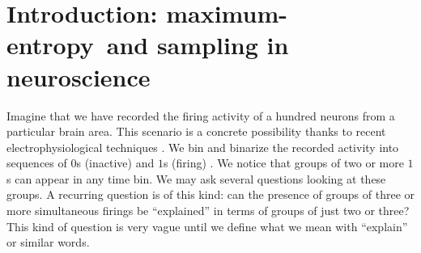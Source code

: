 \documentclass{article}
\title{\pdftitle}
\author{
  P.G.L. Porta Mana\\\texttt{piero.mana@ntnu.org}
  \And
  V. Rostami\\\texttt{v.rostami@fz-juelich.de}
  \And
E. Torre\\\texttt{torre@ibk.baug.ethz.ch}
}
\theoremstyle{remark}
\theoremstyle{innote}
\newcommand*{\citep}{\parencites}
\renewcommand*{\cite}{\citep}
\renewcommand*{\|}{\mathpunct{|}}%
\theoremstyle{simple}
\newcommand*{\me}{maximum-entropy}
\begin{document}

\maketitle

\begin{abstract}
  This note shows that the \me\ method can be applied to a representative
  sample from a neuronal population along two different routes: (1) apply
  to the sample; or (2) apply to the population and marginalize to the
  sample. These two routes give inequivalent results. Which route should be
  chosen? Some arguments are presented in favour of the second. The note
  also touches upon probability formulae of representative sampling and
  discusses their possible meanings, a discussion that may be useful for
   sampling problems in neuroscience.
\end{abstract}

\section{Introduction: \me\ and sampling in neuroscience}


Imagine that we have recorded the firing activity of a hundred neurons from
a particular brain area. This scenario is a concrete possibility thanks to
recent electrophysiological techniques \cite{berenyietal2014}. We bin and
binarize the recorded activity into sequences of $0$s (inactive) and $1$s
(firing) \cite{caianiello1961,caianiello1986}. We notice that groups of two
or more $1$s can appear in any time bin. We may ask several questions
looking at these groups. A recurring question is of this kind: can the
presence of groups of three or more simultaneous firings be
\enquote{explained} in terms of groups of just two or three? This kind of
question is very vague until we define what we mean with \enquote{explain}
or similar words.
\end{document}
